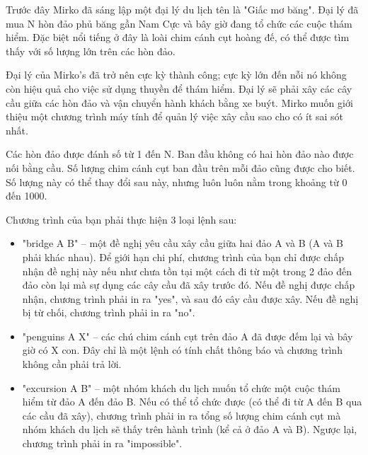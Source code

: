 Trước đây Mirko đã sáng lập một đại lý du lịch tên là "Giấc mơ băng". Đại lý đã mua N hòn đảo phủ băng gần Nam Cực và bây giờ đang tổ chức các cuộc thám hiểm. Đặc biệt nổi tiếng ở đây là loài chim cánh cụt hoàng đế, có thể được tìm thấy với số lượng lớn trên các hòn đảo.  

   Đại lý của Mirko's đã trở nên cực kỳ thành công; cực kỳ lớn đến nỗi nó không còn hiệu quả cho việc sử dụng thuyền để thám hiểm. Đại lý sẽ phải xây các cây cầu giữa các hòn đảo và vận chuyển hành khách bằng xe buýt. Mirko muốn giới thiệu một chương trình máy tính để quản lý việc xây cầu sao cho có ít sai sót nhất.  

   Các hòn đảo được đánh số từ 1 đến N. Ban đầu không có hai hòn đảo nào được nối bằng cầu. Số lượng chim cánh cụt ban đầu trên mỗi đảo cũng được cho biết. Số lượng này có thể thay đổi sau này, nhưng luôn luôn nằm trong khoảng từ 0 đến 1000.  

   Chương trình của bạn phải thực hiện 3 loại lệnh sau:  
\begin{itemize}
	\item     "bridge A B" – một đề nghị yêu cầu xây cầu giữa hai đảo A và B (A và B phải khác nhau). Để giới hạn chi phí, chương trình của bạn chỉ được chấp nhận đề nghị này nếu như chưa tồn tại một cách đi từ một trong 2 đảo đến đảo còn lại mà sự dụng các cây cầu đã xây trước đó. Nếu đề nghị được chấp nhận, chương trình phải in ra "yes", và sau đó cây cầu được xây. Nếu đề nghị bị từ chối, chương trình phải in ra "no".   
	\item     "penguins A X" – các chú chim cánh cụt trên đảo A đã được đếm lại và bây giờ có X con. Đây chỉ là một lệnh có tính chất thông báo và chương trình không cần phải trả lời.   
	\item     "excursion A B" – một nhóm khách du lịch muốn tổ chức một cuộc thám hiểm từ đảo A đến đảo B. Nếu có thể tổ chức được (có thể đi từ A đến B qua các cầu đã xây), chương trình phải in ra tổng số lượng chim cánh cụt mà nhóm khách du lịch sẽ thấy trên hành trình (kể cả ở đảo A và B). Ngược lại, chương trình phải in ra "impossible".   
\end{itemize}